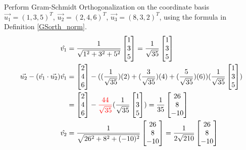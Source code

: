 \begin{exmp}
\label{GSex}
Perform Gram-Schmidt Orthogonalization on the coordinate basis $\vec{u_1} = (1,3,5)^T$, $\vec{u_2} = (2,4,6)^T$, $\vec{u_3} = (8,3,2)^T$, using the formula in Definition \ref{GSorth_norm}.
\begin{align*}
\hat{v_1} &= \frac{1}{\sqrt{1^2+3^2+5^2}}
\begin{bmatrix}
1 \\
3 \\
5
\end{bmatrix} 
= 
\frac{1}{\sqrt{35}}
\begin{bmatrix}
1 \\
3 \\
5
\end{bmatrix} \\
\vec{u_2} - (\hat{v_1} \cdot \vec{u_2})\hat{v_1} &= 
\begin{bmatrix}
2 \\
4 \\
6
\end{bmatrix} 
-
((\frac{1}{\sqrt{35}})(2) + (\frac{3}{\sqrt{35}})(4) + (\frac{5}{\sqrt{35}})(6))
(\frac{1}{\sqrt{35}}
\begin{bmatrix}
1 \\
3 \\
5
\end{bmatrix}) \\
&= 
\begin{bmatrix}
2 \\
4 \\
6
\end{bmatrix} 
-
\textcolor{red}{\frac{44}{\sqrt{35}}}
(\frac{1}{\sqrt{35}}
\begin{bmatrix}
1 \\
3 \\
5
\end{bmatrix})
=
\frac{1}{35}
\begin{bmatrix}
26 \\
8 \\
-10
\end{bmatrix} \\
\hat{v_2} &= \frac{1}{\sqrt{26^2+8^2+(-10)^2}}
\begin{bmatrix}
26 \\
8 \\
-10
\end{bmatrix}
=
\frac{1}{2\sqrt{210}}
\begin{bmatrix}
26 \\
8 \\
-10
\end{bmatrix}

\end{align*}
\end{exmp}
